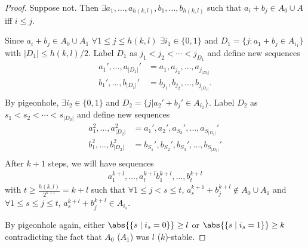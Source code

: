 \documentclass{article}
\begin{document}
\begin{proof}
  Suppose not. Then $\exists a_1, \dotsc, a_{h(k,l)}, b_1, \dotsc, b_{h(k,l)}$ such that $a_i + b_j \in A_0 \cup A$ iff $i \leq j$.
  \begin{center}
  \end{center}
  Since $a_i + b_j \in A_0 \cup A_1$ $\forall 1 \leq j \leq h(k,l)$ $\exists i_1 \in \{0,1\}$ and $D_1 = \{j : a_1 + b_j \in A_{i_1}\}$ with $|D_1| \leq h(k,l)/2$. Label $D_1$ as $j_1 < j_2 < \dotsb < j_{D_1}$ and define new sequences
  \begin{align*}
    a_1', \dotsc, a_{|D_1|}' &= a_1, a_{j_2}, \dotsc, a_{j_{|D_1|}} \\
    b_1', \dotsc, b_{|D_1|}' &= b_{j_1}, b_{j_2}, \dotsc, b_{j_{|D_1|}}. \\
  \end{align*}
  By pigeonhole, $\exists i_2 \in \{0,1\}$ and $D_2 = \{j | a_2' + b_j' \in A_{i_2}\}$.
  Label $D_2$ as $s_1 < s_2 < \dotsb < s_{|D_2|}$ and define new sequences
  \begin{align*}
    a_1^2 , \dotsc, a_{|D_2|}^2 &= a_1', a_2', a_{S_3}', \dotsc, a_{S_{|D_2|}}' \\
    b_1^2 , \dotsc, b_{|D_2|}^2 &= b_{S_1}', b_{S_2}', b_{S_3}', \dotsc, b_{S_{|D_2|}}' \\
  \end{align*}
  After $k+1$ steps, we will have sequences
  \begin{align*}
    a_1^{k+l}, \dotsc, a_t^{k+l}
    b_1^{k+l}, \dotsc, b_t^{k+l}
  \end{align*}
  with $t \geq \frac{h(k,l)}{2^{k+l}} = k+l$ such that $\forall 1 \leq j < s \leq t$, $a_s^{k+1} + b_j^{k+l} \notin A_0 \cup A_1$ and $\forall 1 \leq s \leq j \leq t$, $a_s^{k+l} + b_j^{k+l} \in A_{i_s}$.

  By pigeonhole again, either $\abs{\{s \mid i_s = 0\}} \geq l$ or $\abs{\{s \mid i_s = 1\}} \geq k$ contradicting the fact that $A_0$ ($A_1$) was $l$ ($k$)-stable.
\end{proof}
\end{document}
